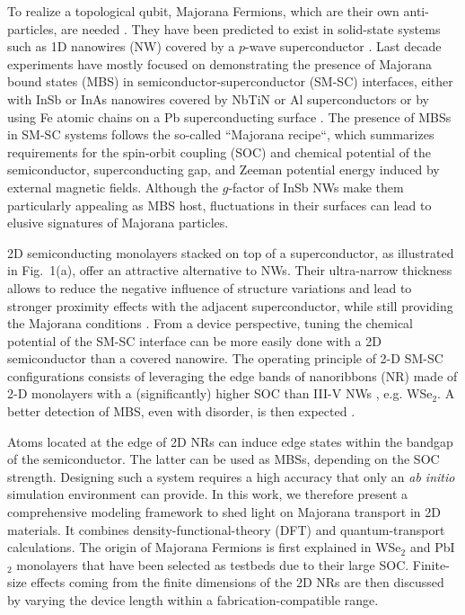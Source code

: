 \documentclass[10pt,usletter,conference]{IEEEtran}
\begin{document}
\par To realize a topological qubit, Majorana Fermions, which are
their own anti-particles, are needed \cite{Majorana}. They have been
predicted to exist in solid-state systems such as 1D nanowires (NW)
covered by a $p$-wave superconductor \cite{Kitaev}. Last decade
experiments have mostly focused on demonstrating the presence of
Majorana bound states (MBS) in semiconductor-superconductor (SM-SC)
interfaces, either with InSb or InAs nanowires covered by NbTiN or Al
superconductors \cite{Mourik,Deng,Zhang} or by using Fe 
atomic chains on a Pb superconducting surface \cite{Nadj}. The
presence of MBSs in SM-SC systems follows the so-called ``Majorana
recipe``, which summarizes requirements for the spin-orbit coupling
(SOC) and chemical potential of the semiconductor, superconducting
gap, and Zeeman potential energy induced by external magnetic
fields. Although the $g$-factor of InSb NWs make them particularly
appealing as MBS host, fluctuations in their surfaces can lead to
elusive signatures of Majorana particles.

\par 2D semiconducting monolayers stacked on top of a superconductor, 
as illustrated in Fig.~1(a), offer an attractive alternative to
NWs. Their ultra-narrow thickness allows to reduce the negative
influence of structure variations and lead to stronger proximity
effects with the adjacent superconductor, while still providing the
Majorana conditions \cite{Chu}.  From a device perspective, tuning the
chemical potential of the SM-SC interface can be more easily done with
a 2D semiconductor than a covered nanowire. The operating principle of
2-D SM-SC configurations consists of leveraging the edge bands of
nanoribbons (NR) made of 2-D monolayers with a (significantly) higher
SOC than III-V NWs \cite{Banerjee}, e.g. WSe$_2$. A better detection
of MBS, even with disorder, is then expected \cite{Chu}.

\par Atoms located at the edge of 2D NRs can induce edge states within
the bandgap of the semiconductor. The latter can be used as MBSs,
depending on the SOC strength. Designing such a system requires a high
accuracy that only an \textit{ab initio} simulation environment can
provide. In this work, we therefore present a comprehensive modeling
framework to shed light on  Majorana transport in 2D materials. It
combines density-functional-theory (DFT) and quantum-transport
calculations. The origin of Majorana Fermions is first explained in
WSe$_2$ and PbI$_2$ monolayers that have been selected as testbeds due 
to their large SOC. Finite-size effects coming from the finite
dimensions of the 2D NRs are then discussed by varying the device
length within a fabrication-compatible range. 
\end{document}
